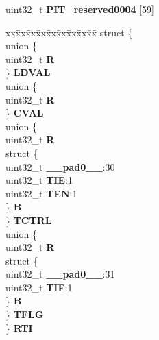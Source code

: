\begin{DoxyCompactItemize}
\begin{tabbing}
\end{tabbing}\item 
\mbox{\label{structPIT__tag_a1b51a36c0de927b4cdf7de806c9119dc}} 
uint32\+\_\+t {\bfseries P\+I\+T\+\_\+reserved0004} \mbox{[}59\mbox{]}
\item 
\mbox{\label{structPIT__tag_af2d42bc214e68bf95378e0b94d58b6f8}} 
\begin{tabbing}
xx\=xx\=xx\=xx\=xx\=xx\=xx\=xx\=xx\=\kill
struct \{\\
\>union \{\\
\>\>uint32\_t {\bfseries R}\\
\>\} {\bfseries LDVAL}\\
\>union \{\\
\>\>uint32\_t {\bfseries R}\\
\>\} {\bfseries CVAL}\\
\>union \{\\
\>\>uint32\_t {\bfseries R}\\
\>\>struct \{\\
\>\>\>uint32\_t {\bfseries \_\_pad0\_\_}:30\\
\>\>\>uint32\_t {\bfseries TIE}:1\\
\>\>\>uint32\_t {\bfseries TEN}:1\\
\>\>\} {\bfseries B}\\
\>\} {\bfseries TCTRL}\\
\>union \{\\
\>\>uint32\_t {\bfseries R}\\
\>\>struct \{\\
\>\>\>uint32\_t {\bfseries \_\_pad0\_\_}:31\\
\>\>\>uint32\_t {\bfseries TIF}:1\\
\>\>\} {\bfseries B}\\
\>\} {\bfseries TFLG}\\
\} {\bfseries RTI}\\


\end{tabbing}
\end{DoxyCompactItemize}
